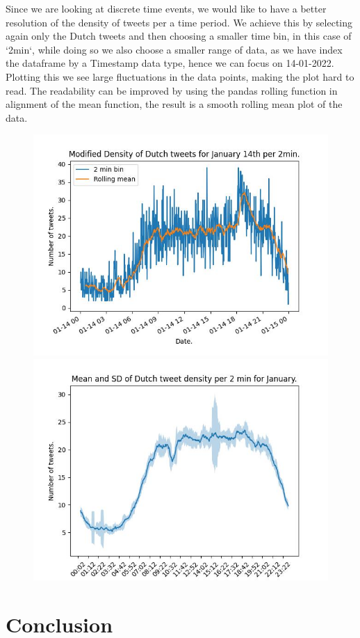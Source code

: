 \documentclass[9pt]{article}
\begin{document}
Since we are looking at discrete time events, we would like to have a better resolution of
the density of tweets per a time period. We achieve this by selecting again only the
Dutch tweets and then choosing a smaller time bin, in this case of `2min`, while doing so
we also choose a smaller range of data, as we have index the dataframe by a Timestamp data
type, hence we can focus on 14-01-2022. Plotting this we see large fluctuations in the
data points, making the plot hard to read. The readability can be improved by using the
pandas rolling function in alignment of the mean function, the result is a smooth rolling
mean plot of the data.


\begin{figure}[h!]
    \center
    \includegraphics[scale=0.3]{figures/JanNLD14roll.jpeg}
    \includegraphics[scale=0.3]{figures/JanNLdayfill.jpeg}
\end{figure}

\section{Conclusion}
\end{document}
